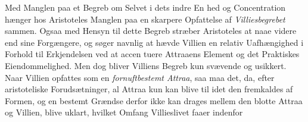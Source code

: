 \documentclass[12pt,a4paper]{book}
\newcommand{\divrule}{\begin{center}\rule{2cm}{0.4pt}\end{center}}
\begin{document}
Med Manglen paa et Begreb om Selvet i dets indre En\-%
hed og Concentration hænger hos Aristoteles Manglen paa en
skarpere Opfattelse af \emph{Villiesbegrebet} sammen. Ogsaa
med Hensyn til dette Begreb stræber Aristoteles at naae videre
end sine Forgængere, og søger navnlig at hævde Villien en
relativ Uafhængighed i Forhold til Erkjendelsen ved at accen\-%
tuere Attraaens Element og det Praktiskes Eiendommelighed.
Men dog bliver Villiens Begreb kun svævende og usikkert.
Naar Villien opfattes som en \emph{fornuftbestemt Attraa}, saa
maa det, da, efter aristoteliske Forudsætninger, al Attraa kun
kan blive til idet den fremkaldes af Formen, og en bestemt
Grændse derfor ikke kan drages mellem den blotte Attraa og
Villien, blive uklart, hvilket Omfang Villieslivet faaer indenfor
%
\end{document}
